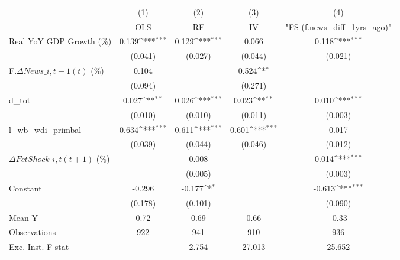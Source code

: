 {
\def\sym#1{\ifmmode^{#1}\else\(^{#1}\)\fi}
\begin{tabular}{l*{4}{c}}
\toprule
                    &\multicolumn{1}{c}{(1)}&\multicolumn{1}{c}{(2)}&\multicolumn{1}{c}{(3)}&\multicolumn{1}{c}{(4)}\\
                    &\multicolumn{1}{c}{OLS}&\multicolumn{1}{c}{RF}&\multicolumn{1}{c}{IV}&\multicolumn{1}{c}{ "FS (f.news\_diff\_1yrs\_ago)" }\\
\midrule
Real YoY GDP Growth (\%)&       0.139\sym{***}&       0.129\sym{***}&       0.066         &       0.118\sym{***}\\
                    &     (0.041)         &     (0.027)         &     (0.044)         &     (0.021)         \\
\addlinespace
F.$ \Delta News\_{i,t-1}(t)$ (\%)&       0.104         &                     &       0.524\sym{*}  &                     \\
                    &     (0.094)         &                     &     (0.271)         &                     \\
\addlinespace
d\_tot               &       0.027\sym{**} &       0.026\sym{***}&       0.023\sym{**} &       0.010\sym{***}\\
                    &     (0.010)         &     (0.010)         &     (0.011)         &     (0.003)         \\
\addlinespace
l\_wb\_wdi\_primbal    &       0.634\sym{***}&       0.611\sym{***}&       0.601\sym{***}&       0.017         \\
                    &     (0.039)         &     (0.044)         &     (0.046)         &     (0.012)         \\
\addlinespace
$ \Delta FctShock\_{i,t}(t+1)$ (\%)&                     &       0.008         &                     &       0.014\sym{***}\\
                    &                     &     (0.005)         &                     &     (0.003)         \\
\addlinespace
Constant            &      -0.296         &      -0.177\sym{*}  &                     &      -0.613\sym{***}\\
                    &     (0.178)         &     (0.101)         &                     &     (0.090)         \\
\midrule
Mean Y              &        0.72         &        0.69         &        0.66         &       -0.33         \\
Observations        &         922         &         941         &         910         &         936         \\
Exc. Inst. F-stat   &                     &       2.754         &      27.013         &      25.652         \\
\bottomrule
\end{tabular}
}
